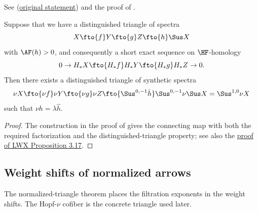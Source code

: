 \begin{proposition}
\label{paper:3.17}
See \cite[Proposition 3.17]{LWX126}
(\href{paper/main.tex.html#L929}{original statement}) and the proof
of \cite[Lemma 9.15]{BHS}.\par

\label{prop:41561db2}
    Suppose that we have a  distinguished triangle of spectra
    $$X\fto{f} Y\fto{g} Z\fto{h} \Sus X$$
    with $\AF(h)>0$, and consequently a short exact sequence on $\HF$-homology
    $$0\to H_*X\fto{H_*f} H_*Y\fto{H_*g} H_*Z\to 0.$$
    Then there exists a distinguished triangle of synthetic spectra
    $$\nu X\fto{\nu f}\nu Y\fto{\nu g} \nu Z\fto{\Sus^{0,-1}\hat h} \Sus^{0,-1}\nu \Sus X=\Sus^{1,0}\nu X$$
    such that $\nu h=\lambda \hat h$.




\end{proposition}
\begin{proof}
The construction in the proof of \cite[Lemma 9.15]{BHS} gives the
connecting map with both the required factorization and the
distinguished-triangle property; see also the
\href{paper/main.tex.html#L938}{proof of LWX Proposition 3.17}.
\end{proof}


\subsection{Weight shifts of normalized arrows}
The normalized-triangle theorem places the filtration exponents in
the weight shifts. The Hopf-$\nu$ cofiber is the concrete triangle used
later.

